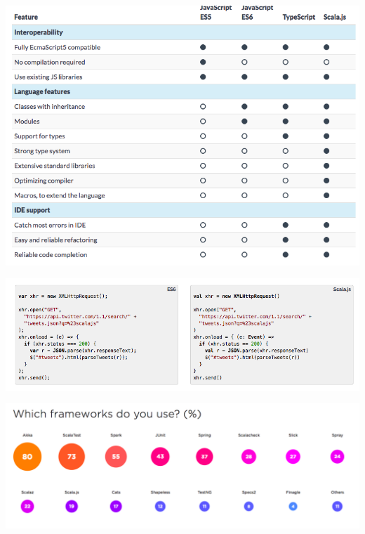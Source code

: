 \documentclass{beamer}
\begin{document}
\begin{frame}
    \includegraphics[width=\textwidth]{ScalaJS.png}
\end{frame}

\begin{frame}
    \includegraphics[width=\textwidth]{Interop.png}
\end{frame}

\begin{frame}
    \includegraphics[width=\textwidth]{JetbrainsFrameworks.png}
\end{frame}
\end{document}
